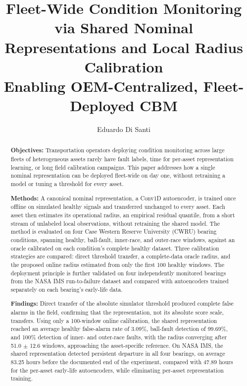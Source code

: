 \documentclass[11pt,a4paper]{article}
\title{
\large
\textbf{Fleet-Wide Condition Monitoring via Shared Nominal Representations and Local Radius Calibration}\\
\medskip
Enabling OEM-Centralized, Fleet-Deployed CBM
}
\author[1]{Eduardo Di Santi}
\affil[1]{Department of Applied Mathematics, University of Colorado Boulder
}
\date{}
\begin{document}
\maketitle

\begin{abstract}

\textbf{Objectives:} Transportation operators deploying condition monitoring
across large fleets of heterogeneous assets rarely have fault labels, time
for per-asset representation learning, or long field calibration campaigns.
This paper addresses how a single nominal representation can be deployed
fleet-wide on day one, without retraining a model or tuning a threshold for
every asset.

\textbf{Methods:} A canonical nominal representation, a Conv1D autoencoder,
is trained once offline on simulated healthy signals and
transferred unchanged to every asset. Each asset then estimates its
operational radius, an empirical residual quantile, from a short stream of
unlabeled local observations, without retraining the shared model. The
method is evaluated on four Case Western Reserve University (CWRU) bearing
conditions, spanning healthy, ball-fault, inner-race, and outer-race
windows, against an oracle calibrated on each condition's complete healthy
dataset. Three calibration strategies are compared: direct threshold
transfer, a complete-data oracle radius, and the proposed online radius
estimated from only the first 100 healthy windows.
The deployment principle is further validated on four independently
monitored bearings from the NASA IMS run-to-failure dataset and compared
with autoencoders trained separately on each bearing's early-life data.


\textbf{Findings:} Direct transfer of the absolute simulator threshold
produced complete false alarms in the field, confirming that the
representation, not its absolute score scale, transfers. Using only a
100-window online calibration, the shared representation reached an
average healthy false-alarm rate of 3.09\%, ball-fault detection of
99.69\%, and 100\% detection of inner- and outer-race faults, with the
radius converging after 51.0 $\pm$ 12.6 windows, approaching the
asset-specific reference.
On NASA IMS, the shared representation detected persistent departure in
all four bearings, on average 83.25 hours before the documented end of the
experiment, compared with 47.89 hours for the per-asset early-life
autoencoders, while eliminating per-asset representation training.


\end{abstract}
\end{document}

